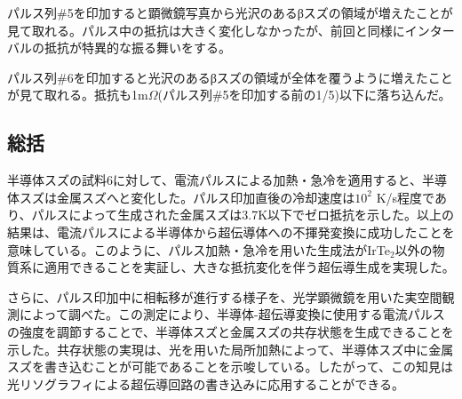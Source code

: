 パルス列\#5を印加すると顕微鏡写真から光沢のあるβスズの領域が増えたことが見て取れる。パルス中の抵抗は大きく変化しなかったが、前回と同様にインターバルの抵抗が特異的な振る舞いをする。

パルス列\#6を印加すると光沢のあるβスズの領域が全体を覆うように増えたことが見て取れる。抵抗も1m$\Omega$(パルス列\#5を印加する前の1/5)以下に落ち込んだ。

\subsection{総括}
半導体スズの試料6に対して、電流パルスによる加熱・急冷を適用すると、半導体スズは金属スズへと変化した。パルス印加直後の冷却速度は$10^2$ K/s程度であり、パルスによって生成された金属スズは3.7K以下でゼロ抵抗を示した。以上の結果は、電流パルスによる半導体から超伝導体への不揮発変換に成功したことを意味している。このように、パルス加熱・急冷を用いた生成法がIrTe$_2$以外の物質系に適用できることを実証し、大きな抵抗変化を伴う超伝導生成を実現した。

さらに、パルス印加中に相転移が進行する様子を、光学顕微鏡を用いた実空間観測によって調べた。この測定により、半導体-超伝導変換に使用する電流パルスの強度を調節することで、半導体スズと金属スズの共存状態を生成できることを示した。共存状態の実現は、光を用いた局所加熱によって、半導体スズ中に金属スズを書き込むことが可能であることを示唆している。したがって、この知見は光リソグラフィによる超伝導回路の書き込みに応用することができる。


\clearpage

